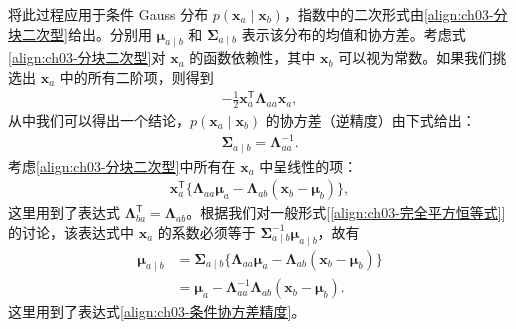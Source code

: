 \documentclass[../../main.tex]{subfiles}
\begin{document}
将此过程应用于条件 Gauss 分布 $p(\boldsymbol{x}_{a}\mid\boldsymbol{x}_{b})$，指数中的二次形式由\eqref{align:ch03-分块二次型}给出。分别用 $\boldsymbol{\mu}_{a\mid b}$ 和 $\boldsymbol{\Sigma}_{a\mid b}$ 表示该分布的均值和协方差。考虑式\eqref{align:ch03-分块二次型}对 $\boldsymbol{x}_{a}$ 的函数依赖性，其中 $\boldsymbol{x}_{b}$ 可以视为常数。如果我们挑选出 $\boldsymbol{x}_{a}$ 中的所有二阶项，则得到
\begin{align}
-\frac{1}{2}\boldsymbol{x}_{a}^{\mathsf{T}}\boldsymbol{\Lambda}_{aa}\boldsymbol{x}_{a},
\label{align:ch03-条件二阶项}
\end{align}
从中我们可以得出一个结论，$p(\boldsymbol{x}_{a}\mid\boldsymbol{x}_{b})$ 的协方差（逆精度）由下式给出：
\begin{align}
\boldsymbol{\Sigma}_{a\mid b}=\boldsymbol{\Lambda}_{aa}^{-1}.
\label{align:ch03-条件协方差精度}
\end{align}
考虑\eqref{align:ch03-分块二次型}中所有在 $\boldsymbol{x}_{a}$ 中呈线性的项：
\begin{align}
\boldsymbol{x}_{a}^{\mathsf{T}}\bigl\{\boldsymbol{\Lambda}_{aa}\boldsymbol{\mu}_{a}-\boldsymbol{\Lambda}_{ab}(\boldsymbol{x}_{b}-\boldsymbol{\mu}_{b})\bigr\},
\label{align:ch03-条件线性项}
\end{align}
这里用到了表达式 $\boldsymbol{\Lambda}_{ba}^{\mathsf{T}}=\boldsymbol{\Lambda}_{ab}$。根据我们对一般形式[\eqref{align:ch03-完全平方恒等式}]的讨论，该表达式中 $\boldsymbol{x}_{a}$ 的系数必须等于 $\boldsymbol{\Sigma}_{a\mid b}^{-1}\boldsymbol{\mu}_{a\mid b}$，故有
\begin{align}
\boldsymbol{\mu}_{a\mid b}&=\boldsymbol{\Sigma}_{a\mid b}\bigl\{\boldsymbol{\Lambda}_{aa}\boldsymbol{\mu}_{a}-\boldsymbol{\Lambda}_{ab}(\boldsymbol{x}_{b}-\boldsymbol{\mu}_{b})\bigr\}\nonumber\\
&=\boldsymbol{\mu}_{a}-\boldsymbol{\Lambda}_{aa}^{-1}\boldsymbol{\Lambda}_{ab}(\boldsymbol{x}_{b}-\boldsymbol{\mu}_{b}).
\label{align:ch03-条件均值精度}
\end{align}
这里用到了表达式\eqref{align:ch03-条件协方差精度}。
\end{document}
